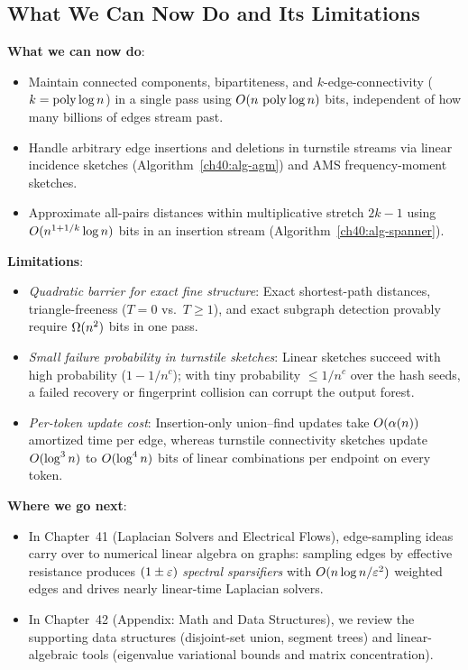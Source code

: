 \subsection{What We Can Now Do and Its Limitations}
\begin{connectionbox}
\textbf{What we can now do}:
\begin{itemize}
  \item Maintain connected components, bipartiteness, and $k$-edge-connectivity ($k=\operatorname{poly}\log n$) in a single pass using $O(n\,\operatorname{poly}\log n)$ bits, independent of how many billions of edges stream past.
  \item Handle arbitrary edge insertions and deletions in turnstile streams via linear incidence sketches (Algorithm~\ref{ch40:alg-agm}) and AMS frequency-moment sketches.
  \item Approximate all-pairs distances within multiplicative stretch $2k-1$ using $O(n^{1+1/k}\log n)$ bits in an insertion stream (Algorithm~\ref{ch40:alg-spanner}).
\end{itemize}

\textbf{Limitations}:
\begin{itemize}
  \item \emph{Quadratic barrier for exact fine structure}: Exact shortest-path distances, triangle-freeness ($T=0$ vs.\ $T\ge 1$), and exact subgraph detection provably require $\Omega(n^2)$ bits in one pass.
  \item \emph{Small failure probability in turnstile sketches}: Linear sketches succeed with high probability ($1 - 1/n^c$); with tiny probability $\le 1/n^c$ over the hash seeds, a failed recovery or fingerprint collision can corrupt the output forest.
  \item \emph{Per-token update cost}: Insertion-only union--find updates take $O(\alpha(n))$ amortized time per edge, whereas turnstile connectivity sketches update $O(\log^3 n)$ to $O(\log^4 n)$ bits of linear combinations per endpoint on every token.
\end{itemize}

\textbf{Where we go next}:
\begin{itemize}
  \item In Chapter~41 (Laplacian Solvers and Electrical Flows), edge-sampling ideas carry over to numerical linear algebra on graphs: sampling edges by effective resistance produces $(1 \pm \varepsilon)$ \emph{spectral sparsifiers} with $O(n \log n / \varepsilon^2)$ weighted edges and drives nearly linear-time Laplacian solvers.
  \item In Chapter~42 (Appendix: Math and Data Structures), we review the supporting data structures (disjoint-set union, segment trees) and linear-algebraic tools (eigenvalue variational bounds and matrix concentration).
\end{itemize}
\end{connectionbox}

